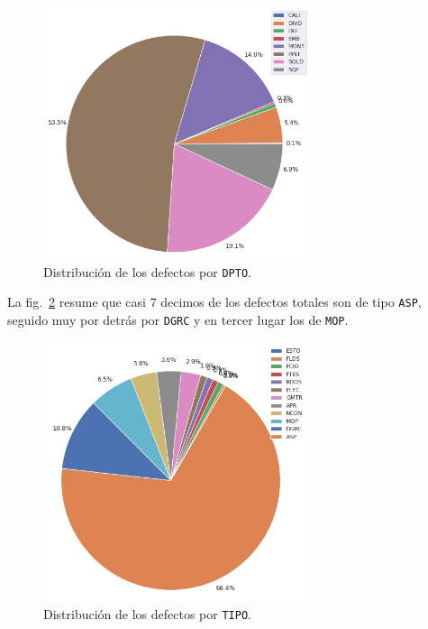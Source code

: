 \documentclass[a4paper,12pt]{article}
\begin{document}
\begin{figure}[H]
	\begin{center}				
	\includegraphics[width=0.7\textwidth]{tesis_53.png}
  	\caption{Distribución de los defectos por \texttt{DPTO}.}
  	\label{fig:distgvddpto}
  	\end{center}
\end{figure}

La fig.~\ref{fig:distgvdtype} resume que casi 7 decimos de los defectos totales son de tipo \texttt{ASP}, seguido muy por detrás por \texttt{DGRC} y en tercer lugar los de \texttt{MOP}.

\begin{figure}[H]
	\begin{center}				
	\includegraphics[width=0.7\textwidth]{tesis_55.png}
  	\caption{Distribución de los defectos por \texttt{TIPO}.}
  	\label{fig:distgvdtype}
  	\end{center}
\end{figure}
\end{document}
